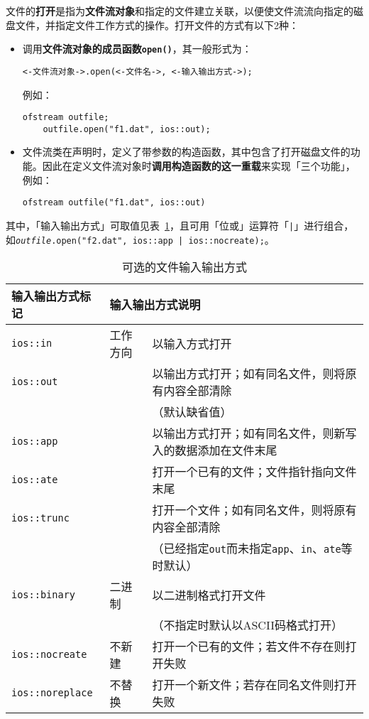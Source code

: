 \documentclass[10pt, a4paper, oneside, fontset=none]{ctexart}
\theoremstyle{plain}
\theoremstyle{definition}
\newcommand{\colors}[1]{\color{#1!75!black}}
\newcommand{\tboba}[1]{\textbf{\kai\color{bali!75!black}#1}}
\begin{document}
文件的\tboba{打开}是指为\textbf{文件流对象}和指定的文件建立关联，以便使文件流流向指定的磁盘文件，并指定文件工作方式的操作。打开文件的方式有以下2种：
\begin{itemize}
	\item 调用\textbf{文件流对象的成员函数\texttt{open()}}，其一般形式为：
\begin{lstlisting}[style=intro, xleftmargin=1em]
	<-文件流对象->.open(<-文件名->, <-输入输出方式->);
\end{lstlisting}
	例如：
\begin{lstlisting}[xleftmargin=1em, 
	moreemph={ofstream}, emphstyle=\colors{qinglv}, 
	moreemph={[2]{outfile}}, emphstyle={[2]\it\ttfamily},]
	ofstream outfile;
	outfile.open("f1.dat", ios::out);
\end{lstlisting}
	\item 文件流类在声明时，定义了带参数的构造函数，其中包含了打开磁盘文件的功能。因此在定义文件流对象时\textbf{调用构造函数的这一重载}来实现「三个功能」，例如：
\begin{lstlisting}[xleftmargin=1em, 
	moreemph={ofstream}, emphstyle=\colors{qinglv}, 
	moreemph={[2]{outfile}}, emphstyle={[2]\it\ttfamily},]
	ofstream outfile("f1.dat", ios::out)
\end{lstlisting}
\end{itemize}

其中，「输入输出方式」可取值见表~\ref{Tab: 输入输出方式}，且可用「位或」运算符「\texttt{|}」进行组合，如\texttt{\textit{outfile}.open("f2.dat", ios::app | ios::nocreate);}。
\begin{table}[ht!]
	\caption{可选的文件输入输出方式}\label{Tab: 输入输出方式}
	\centering
	\begin{tabular}{lll}
		\toprule
		\textbf{输入输出方式标记} & \multicolumn{2}{l}{\textbf{输入输出方式说明}}\\
		\midrule
		\texttt{ios::in} & 工作方向 & 以输入方式打开 \\
		\texttt{ios::out} & ~ & 以输出方式打开；如有同名文件，则将原有内容全部清除 \\
		~ & ~ & {\kai（默认缺省值）} \\
		\texttt{ios::app} & ~ & 以输出方式打开；如有同名文件，则新写入的数据添加在文件末尾 \\
		\texttt{ios::ate} & ~ & 打开一个已有的文件；文件指针指向文件末尾 \\
		\texttt{ios::trunc} & ~ & 打开一个文件；如有同名文件，则将原有内容全部清除 \\
		~ & ~ & {\kai（已经指定\texttt{out}而未指定\texttt{app}、\texttt{in}、\texttt{ate}等时默认）} \\
		\texttt{ios::binary} & 二进制 & 以二进制格式打开文件 \\
		~ & ~ & {\kai（不指定时默认以ASCII码格式打开）} \\
		\texttt{ios::nocreate} & 不新建 & 打开一个已有的文件；若文件不存在则打开失败 \\
		\texttt{ios::noreplace} & 不替换 & 打开一个新文件；若存在同名文件则打开失败 \\
		\bottomrule
	\end{tabular}
\end{table}
\end{document}
